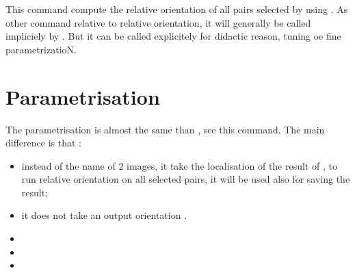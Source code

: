 \documentclass[a4paper]{article}
\begin{document}
\CmdTitle

\tableofcontents



\SecDescr

This command compute the relative orientation of all 
pairs selected by  using 
. As other command relative
to relative orientation, it will generally be called
impliciely by . But it can
be called explicitely for didactic reason, tuning oe fine
parametrizatioN.


\section{Parametrisation}

The parametrisation is almost the same than ,
see this command.
The main difference is that :

\begin{itemize}
  \item instead of the name of $2$ images, it take the localisation
       of the result of , to run relative orientation
        on all selected pairs, it will be used also for saving the result;

  \item it does not take an output orientation .
\end{itemize}



\SecRelatedCmd

\begin{itemize}
   \item  {}
   \item  {}
   \item  {}
\end{itemize}
\end{document}
